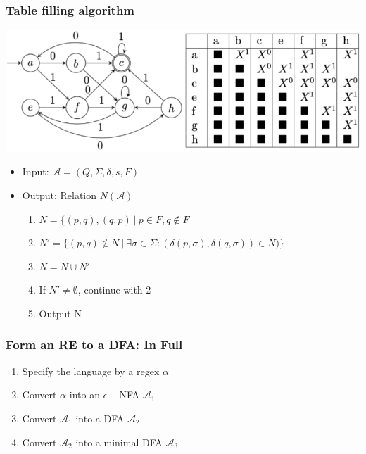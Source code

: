 \documentclass[a3paper, 8pt]{extarticle}
\begin{document}
\begin{multicols*}{6}
\begin{itemize}
\end{itemize}
\subsubsection{Table filling algorithm}
\begin{center}
    \includegraphics[width=\columnwidth]{images/Artboard.png}
\end{center}

\begin{itemize}
    \item Input: $\mathcal{A}=(Q,\Sigma,\delta,s,F)$
    \item Output: Relation $N(\mathcal{A})$ \begin{enumerate}
        \item $N = \{(p,q),(q,p)\:|\:p\in F,q\notin F$
        \item $N' = \{(p,q) \notin N \:|\: \exists \sigma \in \Sigma: (\delta(p,\sigma),\delta(q,\sigma))\in N)\}$ %
        \item $N = N \cup N'$
        \item If $N' \neq \emptyset$, continue with 2
        \item Output N
    \end{enumerate}
\end{itemize}



\subsubsection{Form an RE to a DFA: In Full}
\begin{enumerate}
    \item Specify the language by a regex $\alpha$
    \item Convert $\alpha$ into an $\epsilon-$NFA $\mathcal{A_1}$
    \item Convert $\mathcal{A_1}$ into a DFA $\mathcal{A_2}$
    \item Convert $\mathcal{A_2}$ into a minimal DFA $\mathcal{A_3}$
\end{enumerate}


\end{multicols*}
\end{document}
